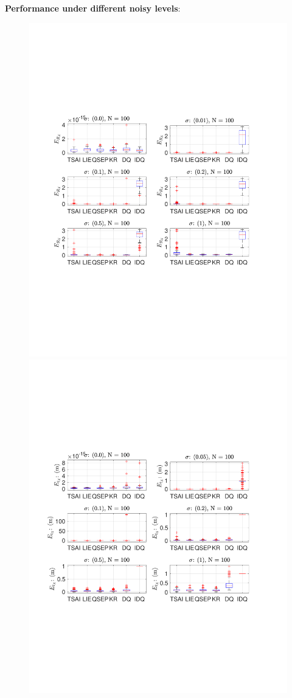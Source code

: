 \textbf{Performance under different noisy levels}:
\begin{figure}
\centering
\includegraphics[scale=0.6]{./hand_eye_figures/conv/conv_r_err_cmp}
\includegraphics[scale=0.6]{./hand_eye_figures/conv/conv_t_err_cmp}

\end{figure}
